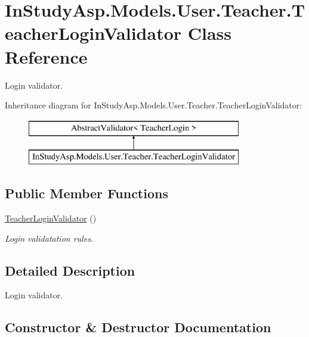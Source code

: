 \hypertarget{class_in_study_asp_1_1_models_1_1_user_1_1_teacher_1_1_teacher_login_validator}{}\section{In\+Study\+Asp.\+Models.\+User.\+Teacher.\+Teacher\+Login\+Validator Class Reference}
\label{class_in_study_asp_1_1_models_1_1_user_1_1_teacher_1_1_teacher_login_validator}


Login validator.  


Inheritance diagram for In\+Study\+Asp.\+Models.\+User.\+Teacher.\+Teacher\+Login\+Validator\+:\begin{figure}[H]
\begin{center}
\leavevmode
\includegraphics[height=2.000000cm]{class_in_study_asp_1_1_models_1_1_user_1_1_teacher_1_1_teacher_login_validator}
\end{center}
\end{figure}
\subsection*{Public Member Functions}
\begin{DoxyCompactItemize}
\item 
\hyperlink{class_in_study_asp_1_1_models_1_1_user_1_1_teacher_1_1_teacher_login_validator_aab5e05b126ee8333975623630ca3ca7a}{Teacher\+Login\+Validator} ()
\begin{DoxyCompactList}\small\item\em Login validatation rules. \end{DoxyCompactList}\end{DoxyCompactItemize}


\subsection{Detailed Description}
Login validator. 

\subsection{Constructor \& Destructor Documentation}
\mbox{\label{class_in_study_asp_1_1_models_1_1_user_1_1_teacher_1_1_teacher_login_validator_aab5e05b126ee8333975623630ca3ca7a}} 
